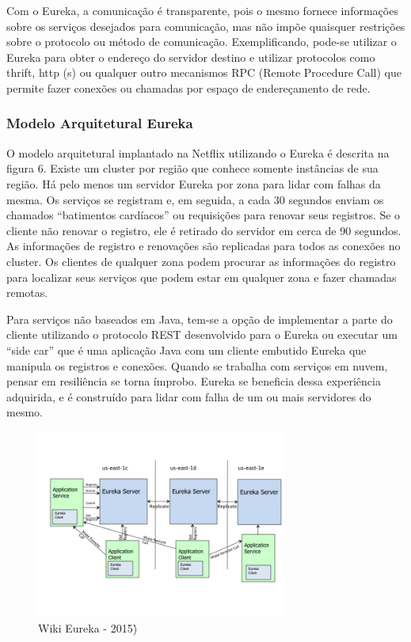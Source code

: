 Com o Eureka, a comunicação é transparente, pois o mesmo fornece informações sobre os serviços desejados para comunicação, mas não impõe quaisquer restrições sobre o protocolo ou método de comunicação. Exemplificando, pode-se utilizar o Eureka para obter o endereço do servidor destino e utilizar protocolos como thrift, http (s) ou qualquer outro mecanismos RPC (Remote Procedure Call) que permite fazer conexões ou chamadas por espaço de endereçamento de rede. 

\subsubsection{Modelo Arquitetural Eureka}
O modelo arquitetural implantado na Netflix utilizando o Eureka é  descrita na figura 6. Existe um cluster por região que conhece somente instâncias de sua região. Há pelo menos um servidor Eureka por zona para lidar com falhas da mesma. Os serviços se registram e, em seguida, a cada 30 segundos enviam os chamados “batimentos cardíacos” ou requisições para renovar seus registros. Se o cliente não renovar o registro, ele é retirado do servidor em cerca de 90 segundos. As informações de registro e renovações são replicadas para todos as conexões no cluster. Os clientes de qualquer zona podem procurar as informações do registro para localizar seus serviços que podem estar em qualquer zona e fazer chamadas remotas.

Para serviços não baseados em Java, tem-se a opção de implementar a parte do cliente utilizando o protocolo REST desenvolvido para o Eureka ou executar um “side car” que é uma aplicação Java com um cliente embutido Eureka que manipula os registros e conexões. Quando se trabalha com serviços em nuvem, pensar em resiliência se torna ímprobo. Eureka se beneficia dessa experiência adquirida, e é construído para lidar com falha de um ou mais servidores do mesmo.

\begin{figure}[h]
\centering
\includegraphics[height=6.2cm]{imagens/figura6}
\caption{Wiki Eureka - 2015)\.}
\label{fig:exemplo}
\end{figure}







